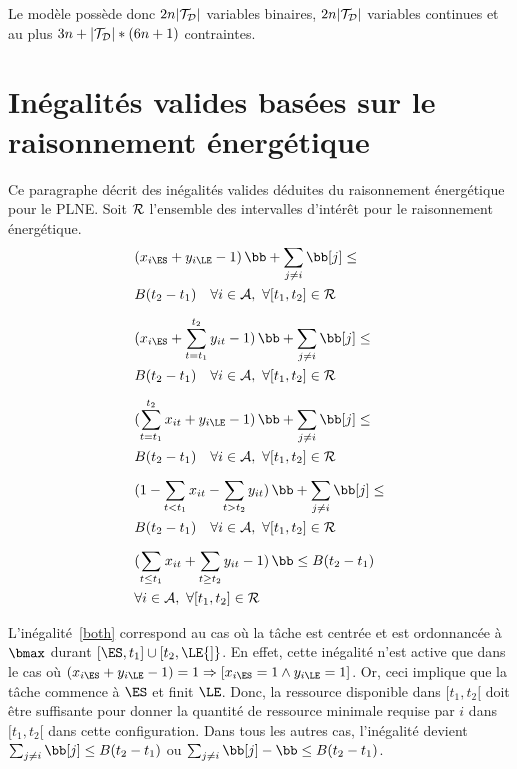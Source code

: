 Le modèle possède donc $2n|{\cal T}_{\cal D}|$ variables binaires,
$2n|{\cal T}_{\cal D}|$ variables continues et au plus $3n+|{\cal
T}_{\cal D}|*(6n+1)$ contraintes.

\section{Inégalités valides basées sur le raisonnement énergétique}
Ce paragraphe décrit des inégalités valides déduites du raisonnement
énergétique pour le PLNE. Soit ${\cal R}$ l'ensemble des intervalles
d'intérêt pour le raisonnement énergétique.
\begin{align}
&(x_{i\ES} + y_{i\LE} -1 ) \, \bb + \sum_{j\neq i}
  \bb[j] \le \nonumber\\ 
&  B(t_2-t_1) \quad \forall i \in {\cal A},\ \forall
  [t_1,t_2] \in {\cal R}
\label{both}\\[2mm] 
&(x_{i\ES} + \sum_{t=t_1}^{t_2}y_{it} -1) \, \bb + \sum_{j\neq i}
  \bb[j] \le \nonumber \\
&  B(t_2-t_1) \quad \forall i \in {\cal A},\ \forall
  [t_1,t_2] \in {\cal R}
\label{left}\\[2mm] 
&(\sum_{t=t_1}^{t_2}x_{it} + y_{i\LE}-1) \, \bb + \sum_{j\neq i}
  \bb[j] \le \nonumber\\
&  B(t_2-t_1) \quad \forall i \in {\cal A},\ \forall
  [t_1,t_2] \in {\cal R}
\label{right}\\[2mm] 
&(1-\sum_{t<t_1}x_{it} - \sum_{t>t_2}y_{it}) \, \bb + \sum_{j\neq i}
  \bb[j] \le \nonumber \\
&  B(t_2-t_1) \quad \forall i \in {\cal A},\ \forall
  [t_1,t_2] \in {\cal R}
\label{total}\\[2mm] 
&(\sum_{t\le t_1}x_{it} + \sum_{t\ge t_2}y_{it} -1 ) \, \bb  \le
B(t_2-t_1) \nonumber\\
&\forall i \in {\cal A},\ \forall
[t_1,t_2] \in {\cal R}
\label{min}
\end{align}

L'inégalité~\eqref{both} correspond au cas où la tâche est centrée et est
ordonnancée à $\bmax$ durant $[\ES,t_1] \cup
[t_2,\LE{]}$. En effet, cette inégalité n'est active que dans
le cas où $(x_{i\ES} + y_{i\LE} -1 )= 1 \Rightarrow
\left[x_{i\ES}=1\land y_{i\LE}=1\right]$. Or,
ceci implique que la tâche commence à $\ES$ et finit
$\LE$. Donc, la ressource disponible dans $[t_1,t_2[$ doit
être suffisante pour donner la quantité de ressource minimale requise
par $i$ dans $[t_1,t_2[$ dans cette configuration.  Dans tous les
autres cas, l'inégalité devient $\sum_{j\neq i} \bb[j] \le B(t_2-t_1)$
ou $\sum_{j\neq i} \bb[j] - \bb \le B(t_2-t_1)$.

